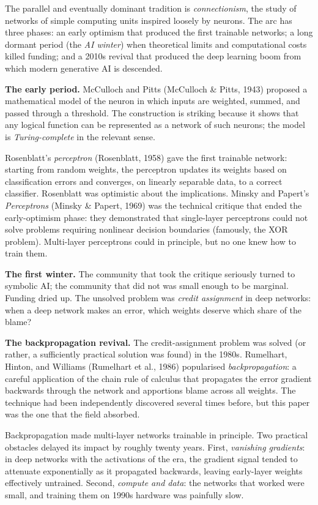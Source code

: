 \documentclass[
  letterpaper,
  11pt]{scrbook}
\begin{document}
The parallel and eventually dominant tradition is \emph{connectionism},
the study of networks of simple computing units inspired loosely by
neurons. The arc has three phases: an early optimism that produced the
first trainable networks; a long dormant period (the \emph{AI winter})
when theoretical limits and computational costs killed funding; and a
2010s revival that produced the deep learning boom from which modern
generative AI is descended.

\textbf{The early period.} McCulloch and Pitts (McCulloch \& Pitts,
1943) proposed a mathematical model of the neuron in which inputs are
weighted, summed, and passed through a threshold. The construction is
striking because it shows that any logical function can be represented
as a network of such neurons; the model is \emph{Turing-complete} in the
relevant sense.

Rosenblatt's \emph{perceptron} (Rosenblatt, 1958) gave the first
trainable network: starting from random weights, the perceptron updates
its weights based on classification errors and converges, on linearly
separable data, to a correct classifier. Rosenblatt was optimistic about
the implications. Minsky and Papert's \emph{Perceptrons} (Minsky \&
Papert, 1969) was the technical critique that ended the early-optimism
phase: they demonstrated that single-layer perceptrons could not solve
problems requiring nonlinear decision boundaries (famously, the XOR
problem). Multi-layer perceptrons could in principle, but no one knew
how to train them.

\textbf{The first winter.} The community that took the critique
seriously turned to symbolic AI; the community that did not was small
enough to be marginal. Funding dried up. The unsolved problem was
\emph{credit assignment} in deep networks: when a deep network makes an
error, which weights deserve which share of the blame?

\textbf{The backpropagation revival.} The credit-assignment problem was
solved (or rather, a sufficiently practical solution was found) in the
1980s. Rumelhart, Hinton, and Williams (Rumelhart et al., 1986)
popularised \emph{backpropagation}: a careful application of the chain
rule of calculus that propagates the error gradient backwards through
the network and apportions blame across all weights. The technique had
been independently discovered several times before, but this paper was
the one that the field absorbed.

Backpropagation made multi-layer networks trainable in principle. Two
practical obstacles delayed its impact by roughly twenty years. First,
\emph{vanishing gradients}: in deep networks with the activations of the
era, the gradient signal tended to attenuate exponentially as it
propagated backwards, leaving early-layer weights effectively untrained.
Second, \emph{compute and data}: the networks that worked were small,
and training them on 1990s hardware was painfully slow.
\end{document}
